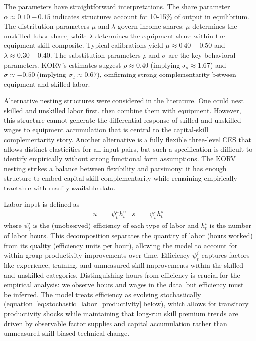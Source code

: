 \documentclass[12pt]{article}
\begin{document}
The parameters have straightforward interpretations. The share parameter $\alpha \approx 0.10-0.15$ indicates structures account for 10-15\% of output in equilibrium. The distribution parameters $\mu$ and $\lambda$ govern income shares: $\mu$ determines the unskilled labor share, while $\lambda$ determines the equipment share within the equipment-skill composite. Typical calibrations yield $\mu \approx 0.40-0.50$ and $\lambda \approx 0.30-0.40$. The substitution parameters $\rho$ and $\sigma$ are the key behavioral parameters. KORV's estimates suggest $\rho \approx 0.40$ (implying $\sigma_s \approx 1.67$) and $\sigma \approx -0.50$ (implying $\sigma_u \approx 0.67$), confirming strong complementarity between equipment and skilled labor. 

Alternative nesting structures were considered in the literature. One could nest skilled and unskilled labor first, then combine them with equipment. However, this structure cannot generate the differential response of skilled and unskilled wages to equipment accumulation that is central to the capital-skill complementarity story. Another alternative is a fully flexible three-level CES that allows distinct elasticities for all input pairs, but such a specification is difficult to identify empirically without strong functional form assumptions. The KORV nesting strikes a balance between flexibility and parsimony: it has enough structure to embed capital-skill complementarity while remaining empirically tractable with readily available data.

Labor input is defined as 
\begin{align*}
 u &= \psi^u_t h^u_t & s &= \psi^s_t h^s_t
\end{align*}
where $\psi^i_t$ is the (unobserved) efficiency of each type of labor and $h^i_t$ is the number of labor hours. This decomposition separates the quantity of labor (hours worked) from its quality (efficiency units per hour), allowing the model to account for within-group productivity improvements over time. Efficiency $\psi^i_t$ captures factors like experience, training, and unmeasured skill improvements within the skilled and unskilled categories. Distinguishing hours from efficiency is crucial for the empirical analysis: we observe hours and wages in the data, but efficiency must be inferred. The model treats efficiency as evolving stochastically (equation~\ref{eq:stochastic_labor_productivity} below), which allows for transitory productivity shocks while maintaining that long-run skill premium trends are driven by observable factor supplies and capital accumulation rather than unmeasured skill-biased technical change.
\end{document}

